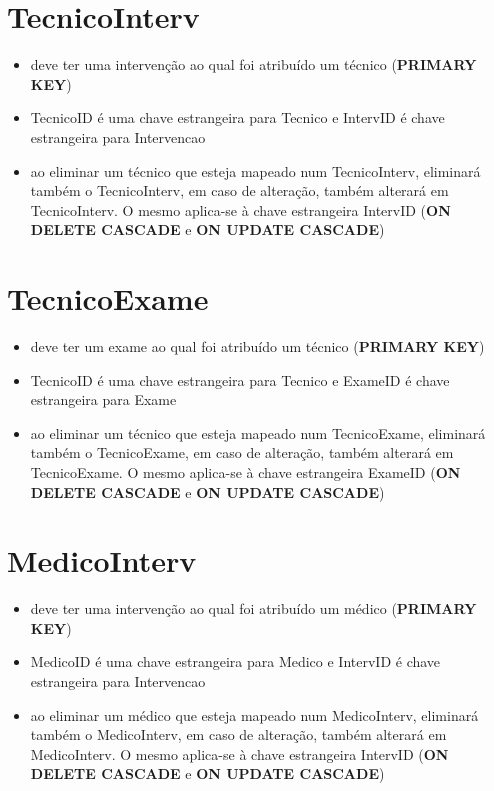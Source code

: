 \documentclass[article, a4paper, 12pt, oneside]{memoir}
\begin{document}
\section*{TecnicoInterv}
\begin{itemize}
	\item deve ter uma intervenção ao qual foi atribuído um técnico (\textbf{PRIMARY KEY})
	\item TecnicoID é uma chave estrangeira para Tecnico e IntervID é chave estrangeira para Intervencao
	\item ao eliminar um técnico que esteja mapeado num TecnicoInterv, eliminará também o TecnicoInterv, em caso de alteração, também alterará em TecnicoInterv. O mesmo aplica-se à chave estrangeira IntervID (\textbf{ON DELETE CASCADE} e \textbf{ON UPDATE CASCADE})
\end{itemize}

\newpage

\section*{TecnicoExame}
\begin{itemize}
	\item deve ter um exame ao qual foi atribuído um técnico (\textbf{PRIMARY KEY})
	\item TecnicoID é uma chave estrangeira para Tecnico e ExameID é chave estrangeira para Exame
	\item ao eliminar um técnico que esteja mapeado num TecnicoExame, eliminará também o TecnicoExame, em caso de alteração, também alterará em TecnicoExame. O mesmo aplica-se à chave estrangeira ExameID (\textbf{ON DELETE CASCADE} e \textbf{ON UPDATE CASCADE})
\end{itemize}

\section*{MedicoInterv}
\begin{itemize}
	\item deve ter uma intervenção ao qual foi atribuído um médico (\textbf{PRIMARY KEY})
	\item MedicoID é uma chave estrangeira para Medico e IntervID é chave estrangeira para Intervencao
	\item ao eliminar um médico que esteja mapeado num MedicoInterv, eliminará também o MedicoInterv, em caso de alteração, também alterará em MedicoInterv. O mesmo aplica-se à chave estrangeira IntervID (\textbf{ON DELETE CASCADE} e \textbf{ON UPDATE CASCADE})
\end{itemize}
\end{document}
